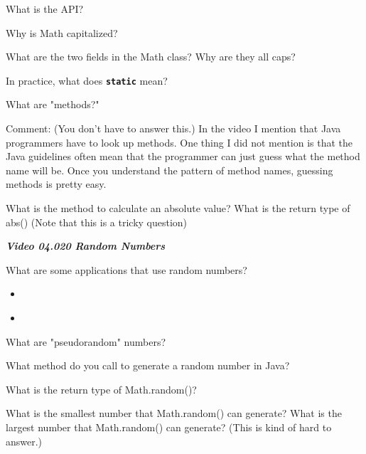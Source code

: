\documentclass[letterpaper,11pt]{exam}
\newcommand{\videoheading}[1]{\Large\textbf{\textit{#1}}}
\begin{document}
\begin{questions}
    \question What is the API?
    \vspace*{1cm}

    \question Why is Math capitalized?

    \question What are the two fields in the Math class?  Why are they all caps?
    \vspace{1cm}

    \question In practice, what does \texttt{\textbf{static}} mean?
    \vspace{.5cm}

    \question What are "methods?"
    \vspace{.5cm}

    Comment:  (You don't have to answer this.) In the video I mention that Java programmers have to look up methods.  One thing I did not mention is that the Java guidelines often mean that the programmer can just guess what the method name will be.  Once you understand the pattern of method names, guessing methods is pretty easy.

  \question What is the method to calculate an absolute value?  
  \question What is the return type of abs() (Note that this is a tricky question)
  \vspace{.75cm}
  

\videoheading{Video 04.020 Random Numbers}

\question What are some applications that use random numbers?
\begin{itemize}
  \item ~
  \item ~
\end{itemize}
\question What are "pseudorandom" numbers?

\question What method do you call to generate a random number in Java?

\question What is the return type of Math.random()?

\question What is the smallest number that Math.random() can generate?
\question What is the largest number that Math.random() can generate?  (This is kind of hard to answer.)
\vspace{.5cm}


\end{questions}
\end{document}
